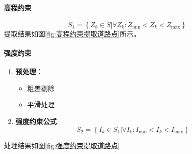 \paragraph{高程约束}
\begin{equation}
S_1 = \left\lbrace Z_k \in S \left| ∀Z_k : Z_{\min} < Z_k < Z_{\max} \right. \right\rbrace 
\end{equation}
提取结果如图\ref{fig:高程约束提取道路点}所示。

\paragraph{强度约束}
\begin{enumerate}
	\item \textbf{预处理}：
		\begin{itemize}
			\item 粗差剔除
			\item 平滑处理
		\end{itemize}
	\item \textbf{强度约束公式}
		\begin{equation}
		S_2 = \left\lbrace I_k \in S_1 \left| ∀I_k : I_{\min} < I_k < I_{\max}  \right. \right\rbrace 
		\end{equation}
\end{enumerate}
处理结果如图\ref{fig:强度约束提取道路点}

